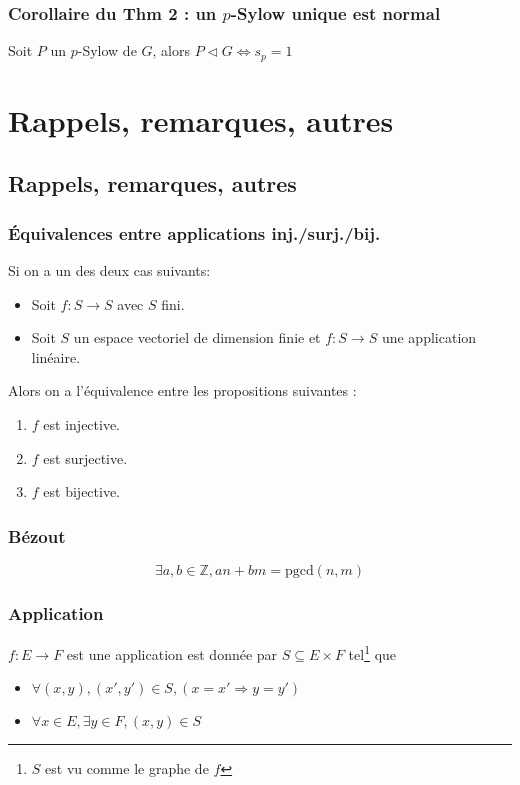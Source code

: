 \documentclass[a4paper,10pt]{report}
\newcommand{\IZ}{\mathbb{Z}} %
\newcommand{\so}{\Rightarrow}
\newcommand{\pgcd}{\mathrm{pgcd}} %
\newcommand{\mfootnote}[1]{\up{(}\footnote{#1}\up{)}}
\begin{document}
  \section{Corollaire du Thm 2 : un $p$-Sylow unique est normal}
   Soit $P$ un $p$-Sylow de $G$, alors $P \triangleleft G \iff s_p=1$

\part{Rappels, remarques, autres}
 \chapter{Rappels, remarques, autres}
  \section{Équivalences entre applications inj./surj./bij.}
   Si on a un des deux cas suivants:
   \begin{itemize}
     \item Soit $f : S \to S$
       avec $S$ fini.
     \item Soit $S$ un espace vectoriel de dimension finie et
       $f : S \to S$ une application linéaire.
   \end{itemize}
   Alors on a l'équivalence entre les propositions suivantes : 
   \begin{enumerate}
     \item $f$ est injective.
     \item $f$ est surjective.
     \item $f$ est bijective.
   \end{enumerate}
 
  \section{Bézout} $$\exists a,b \in \IZ, an+bm=\pgcd(n,m)$$

  \section{Application}
   $f:E \to F$ est une application est donnée par $S \subseteq E \times F$
   tel\mfootnote{$S$ est vu comme le graphe de $f$} que
   \begin{itemize}
     \item
       $\forall(x,y),(x',y') \in S, (x=x' \so y=y')$ 
     \item $\forall x \in E,
       \exists y \in F, (x,y) \in S$
   \end{itemize}
\end{document}
